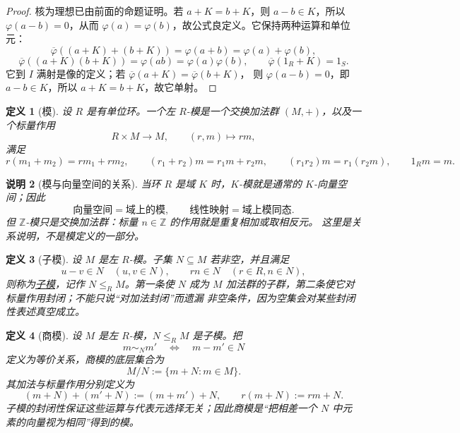 \documentclass[UTF8,fontset=none,a4paper,11pt]{ctexart}
\theoremstyle{foundation-definition}
\newtheorem{definition}{定义}[section]
\theoremstyle{foundation-theorem}
\theoremstyle{foundation-proposition}
\theoremstyle{foundation-example}
\theoremstyle{foundation-remark}
\newtheorem{remark}[definition]{说明}
\theoremstyle{foundation-theorem}
\newcommand{\term}[2]{\hyperref[#1]{#2}}
\begin{document}
\begin{proof}
核为理想已由前面的命题证明。若 \(a+K=b+K\)，则 \(a-b\in K\)，所以
\(\varphi(a-b)=0\)，从而 \(\varphi(a)=\varphi(b)\)，故公式良定义。它保持两种运算和单位元：
\[
\overline{\varphi}((a+K)+(b+K))=\varphi(a+b)
 =\varphi(a)+\varphi(b),
\]
\[
\overline{\varphi}((a+K)(b+K))=\varphi(ab)
 =\varphi(a)\varphi(b),\qquad
\overline{\varphi}(1_R+K)=1_S.
\]
它到 \(I\) 满射是像的定义；若 \(\overline{\varphi}(a+K)=\overline{\varphi}(b+K)\)，
则 \(\varphi(a-b)=0\)，即 \(a-b\in K\)，所以 \(a+K=b+K\)，故它单射。
\end{proof}

\begin{definition}[模]\label{def:module}
设 \(R\) 是有单位环。一个左 \(R\)-模是一个交换加法群 \((M,+)\)，以及一个标量作用
\[
R\times M\longrightarrow M,\qquad (r,m)\longmapsto r m,
\]
满足
\[
r(m_1+m_2)=rm_1+rm_2,\qquad
(r_1+r_2)m=r_1m+r_2m,\qquad
(r_1r_2)m=r_1(r_2m),\qquad
1_Rm=m.
\]
\end{definition}

\begin{remark}[模与向量空间的关系]\label{rem:module-vector-space}
当环 \(R\) 是域 \(K\) 时，\(K\)-模就是通常的 \(K\)-向量空间；因此
\[
\text{向量空间}=\text{域上的模},\qquad
\text{线性映射}=\text{域上模同态}.
\]
但 \(\mathbb Z\)-模只是交换加法群：标量 \(n\in\mathbb Z\) 的作用就是重复相加或取相反元。
这里是关系说明，不是模定义的一部分。
\end{remark}

\begin{definition}[子模]\label{def:submodule}
设 \(M\) 是左 \(R\)-模。子集 \(N\subseteq M\) 若非空，并且满足
\[
u-v\in N\quad(u,v\in N),\qquad rn\in N\quad(r\in R,n\in N),
\]
则称为\term{def:submodule}{子模}，记作 \(N\leq_R M\)。第一条使 \(N\) 成为
\(M\) 加法群的子群，第二条使它对标量作用封闭；不能只说“对加法封闭”而遗漏
非空条件，因为空集会对某些封闭性表述真空成立。
\end{definition}

\begin{definition}[商模]\label{def:quotient-module}
设 \(M\) 是左 \(R\)-模，\(N\leq_R M\) 是子模。把
\[
  m\sim_N m'\quad\Longleftrightarrow\quad m-m'\in N
\]
定义为等价关系，商模的底层集合为
\[
  M/N:=\{m+N:m\in M\}.
\]
其加法与标量作用分别定义为
\[
  (m+N)+(m'+N):=(m+m')+N,\qquad
  r(m+N):=rm+N.
\]
子模的封闭性保证这些运算与代表元选择无关；因此商模是“把相差一个 \(N\) 中元素的向量视为相同”得到的模。
\end{definition}
\end{document}
